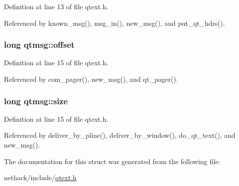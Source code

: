Definition at line 13 of file qtext.\+h.



Referenced by known\+\_\+msg(), msg\+\_\+in(), new\+\_\+msg(), and put\+\_\+qt\+\_\+hdrs().

\hypertarget{structqtmsg_a422909f4fbac3cf1b6a2890e06d4729a}{
\subsubsection[{offset}]{\setlength{\rightskip}{0pt plus 5cm}long qtmsg\+::offset}}\label{structqtmsg_a422909f4fbac3cf1b6a2890e06d4729a}


Definition at line 15 of file qtext.\+h.



Referenced by com\+\_\+pager(), new\+\_\+msg(), and qt\+\_\+pager().

\hypertarget{structqtmsg_a581321cc38e8c15acbf2310751c3b115}{
\subsubsection[{size}]{\setlength{\rightskip}{0pt plus 5cm}long qtmsg\+::size}}\label{structqtmsg_a581321cc38e8c15acbf2310751c3b115}


Definition at line 15 of file qtext.\+h.



Referenced by deliver\+\_\+by\+\_\+pline(), deliver\+\_\+by\+\_\+window(), do\+\_\+qt\+\_\+text(), and new\+\_\+msg().



The documentation for this struct was generated from the following file\+:\begin{DoxyCompactItemize}
\item 
nethack/include/\hyperlink{qtext_8h}{qtext.\+h}\end{DoxyCompactItemize}
